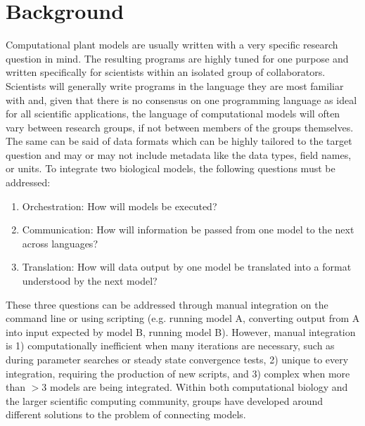 \documentclass[journal]{IEEEtran}
\begin{document}
\section{Background}\label{S:background}
%
Computational plant models are usually written with a very specific research question in mind. The resulting programs are highly tuned for one purpose and written specifically for scientists within an isolated group of collaborators. Scientists will generally write programs in the language they are most familiar with and, given that there is no consensus on one programming language as ideal for all scientific applications, the language of computational models will often vary between research groups, if not between members of the groups themselves. The same can be said of data formats which can be highly tailored to the target question and may or may not include metadata like the data types, field names, or units. To integrate two biological models, the following questions must be addressed:
%
\begin{enumerate}
	\item Orchestration: How will models be executed?
	\item Communication: How will information be passed from one model to the next across languages?
	\item Translation: How will data output by one model be translated into a format understood by the next model?
\end{enumerate}

These three questions can be addressed through manual integration on the command line or using scripting (e.g. running model A, converting output from A into input expected by model B, running model B). However, manual integration is 1) computationally inefficient when many iterations are necessary, such as during parameter searches or steady state convergence tests, 2) unique to every integration, requiring the production of new scripts, and 3) complex when more than $>3$ models are being integrated. Within both computational biology and the larger scientific computing community, groups have developed around different solutions to the problem of connecting models.

\end{document}
